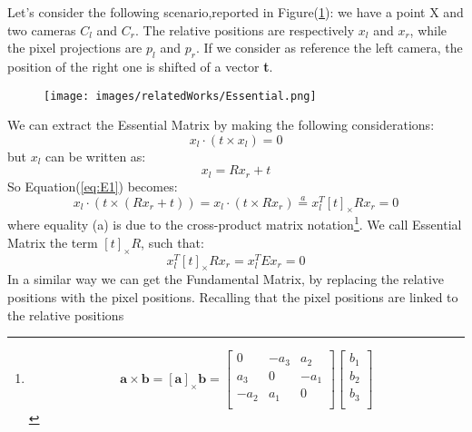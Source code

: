 Let's consider the following scenario,reported in Figure(\ref{fig:EstimateMatrices}): we have a point X and two cameras $C_l$ and $C_r$. 
The relative positions are respectively $x_l$ and $x_r$, while the pixel projections are $p_l$ and $p_r$.
If we consider as reference the left camera, the position of the right one is shifted of a vector \textbf{t}.

\begin{figure}
    \centering
    \texttt{[image: images/relatedWorks/Essential.png]} %
    \caption{}
    \label{fig:EstimateMatrices}
\end{figure}

We can extract the Essential Matrix by making the following considerations:
\begin{equation}
    \label{eq:E1}
    x_l \cdot (t \times x_l) = 0
\end{equation}
but $x_l$ can be written as:
\begin{equation}
    x_l = R x_r + t
\end{equation}
So Equation(\ref{eq:E1}) becomes:
\begin{equation}
    x_l \cdot (t \times (R x_r + t)) = x_l \cdot (t \times R x_r) \stackrel{a}{=}x_l^T  \left[ t\right]_{\times}  R x_r= 0
\end{equation}
where equality (a) is due to the cross-product matrix notation\footnote{
    \[
  \mathbf{a} \times  \mathbf{b}= \left[\mathbf{a}\right] _{\times} \mathbf{b}= \begin{bmatrix}
    0 & -a_3 & a_2 \\
    a_3 & 0 & -a_1 \\
    -a_2 & a_1     & 0     \\
  \end{bmatrix}
  \begin{bmatrix}
    b_1 \\
    b_2\\
    b_3\\
  \end{bmatrix}
\]}.
We call Essential Matrix the term $ \left[ t\right]_{\times}  R$, such that:
\begin{equation}
    \label{eq:EssentialMatrix}
    x_l^T  \left[ t\right]_{\times}  R x_r=x_l^T E x_r= 0
\end{equation}
In a similar way we can get the Fundamental Matrix, by replacing the relative positions
with the pixel positions. Recalling that the pixel positions are linked to the relative positions
